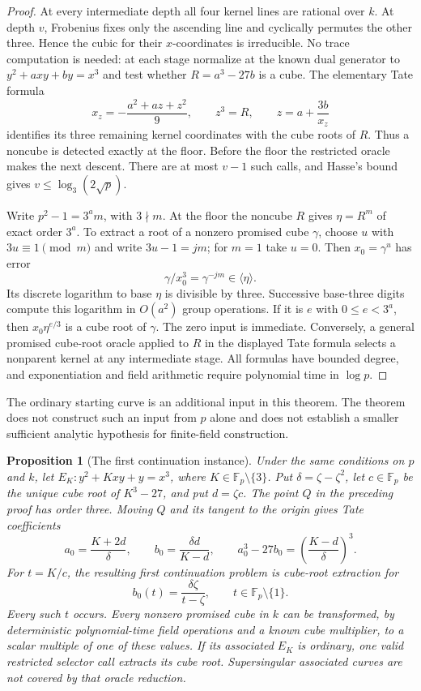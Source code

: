 \documentclass[11pt]{article}
\newtheorem{proposition}[theorem]{Proposition}
\theoremstyle{definition}
\theoremstyle{remark}
\begin{document}
\begin{proof}
At every intermediate depth all four kernel lines are rational
over $k$.  At depth $v$, Frobenius fixes only the ascending
line and cyclically permutes the other three.  Hence the cubic
for their $x$-coordinates is irreducible.  No trace computation
is needed: at each stage normalize at the known dual generator
to $y^2+axy+by=x^3$ and test whether $R=a^3-27b$ is a cube.
The elementary Tate formula
\[
 x_z=-\frac{a^2+az+z^2}{9},\qquad z^3=R,
 \qquad z=a+\frac{3b}{x_z}
\]
identifies its three remaining kernel coordinates with the cube
roots of $R$.  Thus a noncube is detected exactly at the floor.
Before the floor the restricted oracle makes the next descent.
There are at most $v-1$ such calls, and Hasse's bound gives
$v\le\log_3(2\sqrt p)$.

Write $p^2-1=3^a m$, with $3\nmid m$.  At the floor the noncube
$R$ gives $\eta=R^m$ of exact order $3^a$.  To extract a root
of a nonzero promised cube $\gamma$, choose $u$ with
$3u\equiv1\pmod m$ and write $3u-1=jm$; for $m=1$ take
$u=0$.  Then $x_0=\gamma^u$ has error
\[
 \gamma/x_0^3=\gamma^{-jm}\in\langle\eta\rangle.
\]
Its discrete logarithm to base $\eta$ is divisible by three.
Successive base-three digits compute this logarithm in
$O(a^2)$ group operations.  If it is $e$ with $0\le e<3^a$,
then $x_0\eta^{e/3}$ is a cube root of $\gamma$.
The zero input is immediate.  Conversely, a general promised
cube-root oracle applied to $R$ in the displayed Tate formula
selects a nonparent kernel at any intermediate stage.
All formulas have bounded degree, and exponentiation and field
arithmetic require polynomial time in $\log p$.
\end{proof}

The ordinary starting curve is an additional input in this
theorem.  The theorem does not construct such an input from $p$
alone and does not establish a smaller sufficient analytic
hypothesis for finite-field construction.

\begin{proposition}[The first continuation instance]
\label{prop:restricted-mobius-family}
Under the same conditions on $p$ and $k$, let
$E_K:y^2+Kxy+y=x^3$, where $K\in\mathbb F_p\setminus\{3\}$.
Put $\delta=\zeta-\zeta^2$, let $c\in\mathbb F_p$ be the
unique cube root of $K^3-27$, and put $d=\zeta c$.
The point $Q$ in the preceding proof has order three.  Moving
$Q$ and its tangent to the origin gives Tate coefficients
\[
 a_0=\frac{K+2d}{\delta},\qquad
 b_0=\frac{\delta d}{K-d},\qquad
 a_0^3-27b_0=\left(\frac{K-d}{\delta}\right)^3.
\]
For $t=K/c$, the resulting first continuation problem is
cube-root extraction for
\[
 b_0(t)=\frac{\delta\zeta}{t-\zeta},
 \qquad t\in\mathbb F_p\setminus\{1\}.
\]
Every such $t$ occurs.  Every nonzero promised cube in $k$ can
be transformed, by deterministic polynomial-time field
operations and a known cube multiplier, to a scalar multiple
of one of these values.  If its associated $E_K$ is ordinary,
one valid restricted selector call extracts its cube root.
Supersingular associated curves are not covered by that
oracle reduction.
\end{proposition}
\end{document}
